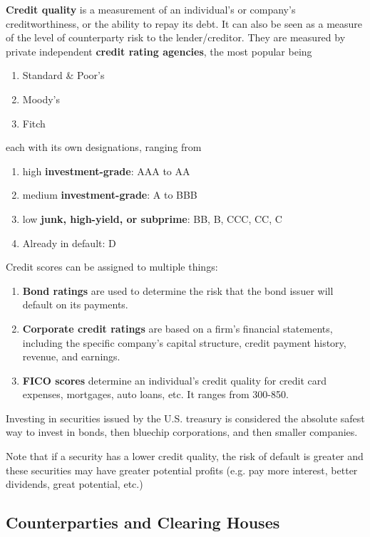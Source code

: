 \documentclass{article}
\begin{document}
    \begin{definition}
      \textbf{Credit quality} is a measurement of an individual's or company's creditworthiness, or the ability to repay its debt. It can also be seen as a measure of the level of counterparty risk to the lender/creditor. They are measured by private independent \textbf{credit rating agencies}, the most popular being
      \begin{enumerate}
        \item Standard \& Poor's 
        \item Moody's 
        \item Fitch
      \end{enumerate}
      each with its own designations, ranging from 
      \begin{enumerate}
        \item high \textbf{investment-grade}: AAA to AA
        \item medium \textbf{investment-grade}: A to BBB
        \item low \textbf{junk, high-yield, or subprime}: BB, B, CCC, CC, C
        \item Already in default: D 
      \end{enumerate}
      Credit scores can be assigned to multiple things:
      \begin{enumerate}
        \item \textbf{Bond ratings} are used to determine the risk that the bond issuer will default on its payments. 
        \item \textbf{Corporate credit ratings} are based on a firm's financial statements, including the specific company's capital structure, credit payment history, revenue, and earnings.
        \item \textbf{FICO scores} determine an individual's credit quality for credit card expenses, mortgages, auto loans, etc. It ranges from 300-850. 
      \end{enumerate}
      Investing in securities issued by the U.S. treasury is considered the absolute safest way to invest in bonds, then bluechip corporations, and then smaller companies. 
    \end{definition}

    Note that if a security has a lower credit quality, the risk of default is greater and these securities may have greater potential profits (e.g. pay more interest, better dividends, great potential, etc.) 

  \subsection{Counterparties and Clearing Houses}
\end{document}
